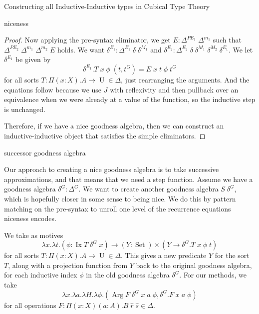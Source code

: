 \documentclass[acmsmall,review]{acmart}\settopmatter{printfolios=true,printccs=false,printacmref=false}
\DeclareMathOperator{\USet}{Set}
\DeclareMathOperator{\UU}{U}
\DeclareMathOperator{\Arg}{Arg}
\DeclareMathOperator{\Ix}{Ix}
\begin{document}
\begin{section}{Constructing all Inductive-Inductive types in Cubical Type Theory}
\begin{subsection}{niceness}
\begin{proof}
Now applying the pre-syntax eliminator, we get $E : \Delta^{PE_1}\;\Delta^{m_1}$ such that $\Delta^{PE_2}\;\Delta^{m_1}\;\Delta^{m_2}\;E$ holds. We want $\delta^{E_1} : \Delta^{E_1}\;\delta\;\delta^{M_1}$ and $\delta^{E_2} : \Delta^{E_2}\;\delta\;\delta^{M_1}\;\delta^{M_2}\;\delta^{E_1}$.
We let $\delta^{E_1}$ be given by \[\delta^{E_1}.T\;x\;\phi\;(t,t^G) = E\;x\;t\;\phi\;t^G\] for all sorts $T : \Pi(x : X).A\to\UU\in\Delta$, just rearranging the arguments. And the equations follow because we use $J$ with reflexivity and then pullback over an equivalence when we were already at a value of the function, so the inductive step is unchanged.

Therefore, if we have a nice goodness algebra, then we can construct an inductive-inductive object that satisfies the simple eliminators.
\end{proof}

\end{subsection}
\begin{subsection}{successor goodness algebra}\label{successor-alg}

Our approach to creating a nice goodness algebra is to take successive approximations, and that means that we need a step function. Assume we have a goodness algebra $\delta^G : \Delta^G$. We want to create another goodness algebra $S\;\delta^G$, which is hopefully closer in some sense to being nice. We do this by pattern matching on the pre-syntax to unroll one level of the recurrence equations niceness encodes.

We take as motives \[\lambda x.\lambda t.(\phi : \Ix T \;\delta^G\;x) \to (Y : \USet)\times (Y \to \delta^G.T\;x\;\phi\;t)\] for all sorts $T : \Pi(x : X).A \to \UU \in\Delta$. This gives a new predicate $Y$ for the sort $T$, along with a projection function from $Y$ back to the original goodness algebra, for each inductive index $\phi$ in the old goodness algebra $\delta^G$.
For our methods, we take \[\lambda x.\lambda a.\lambda H.\lambda \phi. (\Arg F\;\delta^G\;x\;a\;\phi , \delta^G.F\;x\;a\;\phi)\] for all operations $F : \Pi(x : X)(a : A).B\;\hat{r}\;\hat{s}\in\Delta$. 


\end{subsection}
\end{section}
\end{document}
